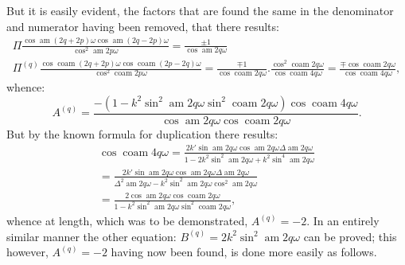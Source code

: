 \documentclass{article}
\begin{document}
But it is easily evident, the factors that are found the same in the denominator and numerator having been removed, that there results:
\[
\begin{gathered}
\Pi\frac{\cos\operatorname{am}(2q+2p)\omega\cos\operatorname{am}(2q-2p)\omega}{\cos^{2}\operatorname{am}2p\omega}=\frac{\pm1}{\cos\operatorname{am}2q\omega}\\[1.5ex]
\Pi^{(q)}\frac{\cos\operatorname{coam}(2q+2p)\omega\cos\operatorname{coam}(2p-2q)\omega}{\cos^{2}\operatorname{coam}2p\omega}=\frac{\mp1}{\cos\operatorname{coam}2q\omega}.\frac{\cos^{2}\operatorname{coam}2q\omega}{\cos\operatorname{coam}4q\omega}=\frac{\mp\cos\operatorname{coam}2q\omega}{\cos\operatorname{coam}4q\omega},
\end{gathered}
\]
whence:
\[
A^{(q)}=\frac{-\left(1-k^{2}\sin^{2}\operatorname{am}2q\omega\sin^{2}\operatorname{coam}2q\omega\right)\cos\operatorname{coam}4q\omega}{\cos\operatorname{am}2q\omega\cos\operatorname{coam}2q\omega}.
\]
But by the known formula for duplication there results:
\[
\begin{gathered}
\cos\operatorname{coam}4q\omega=\frac{2k'\sin\operatorname{am}2q\omega\cos\operatorname{am}2q\omega\Delta\operatorname{am}2q\omega}{1-2k^{2}\sin^{2}\operatorname{am}2q\omega+k^{2}\sin^{4}\operatorname{am}2q\omega}\\[1.5ex]
=\frac{2k'\sin\operatorname{am}2q\omega\cos\operatorname{am}2q\omega\Delta\operatorname{am}2q\omega}{\Delta^{2}\operatorname{am}2q\omega-k^{2}\sin^{2}\operatorname{am}2q\omega\cos^{2}\operatorname{am}2q\omega}\\[1.5ex]
=\frac{2\cos\operatorname{am}2q\omega\cos\operatorname{coam}2q\omega}{1-k^{2}\sin^{2}\operatorname{am}2q\omega\sin^{2}\operatorname{coam}2q\omega},
\end{gathered}
\]
whence at length, which was to be demonstrated, $A^{(q)}=-2$. In an entirely similar manner the other equation: $B^{(q)}=2k^{2}\sin^{2}\operatorname{am}2q\omega$ can be proved; this however, $A^{(q)}=-2$ having now been found, is done more easily as follows.
\end{document}
